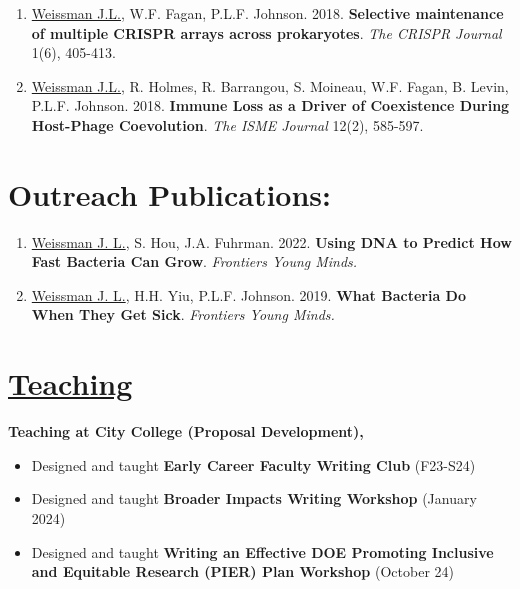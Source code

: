 \documentclass[]{res}
\begin{document}
\begin{resume}
\begin{enumerate}[leftmargin=*]
 \item \underline{Weissman J.L.}, W.F. Fagan, P.L.F. Johnson. 2018. {\bf Selective maintenance of multiple CRISPR arrays across prokaryotes}. \emph{The CRISPR Journal} 1(6), 405-413. %
 
\item \underline{Weissman J.L.}, R. Holmes, R. Barrangou, S. Moineau, W.F. Fagan, B. Levin, P.L.F. Johnson. 2018. {\bf Immune Loss as a Driver of Coexistence During Host-Phage Coevolution}. \emph{The ISME Journal} 12(2), 585-597. %

\end{enumerate} 
 

 
\section{Outreach Publications:} \vspace{0mm}

 \begin{enumerate}[leftmargin=*]

\item \underline{Weissman J. L.}, S. Hou, J.A. Fuhrman. 2022. {\bf Using DNA to Predict How Fast Bacteria Can Grow}. \emph{Frontiers Young Minds.}

\item \underline{Weissman J. L.}, H.H. Yiu, P.L.F. Johnson. 2019. {\bf What Bacteria Do When They Get Sick}. \emph{Frontiers Young Minds.}

  \end{enumerate} 


\section{\underline{Teaching}} \vspace{2mm}

{\bf Teaching at City College (Proposal Development),} 
\begin{itemize} \itemsep -2pt
\item Designed and taught {\bf Early Career Faculty Writing Club} (F23-S24)
\item Designed and taught {\bf Broader Impacts Writing Workshop} (January 2024)
\item Designed and taught {\bf Writing an Effective DOE Promoting Inclusive and Equitable Research (PIER) Plan Workshop} (October 24)
\end{itemize}



\end{resume}
\end{document}
